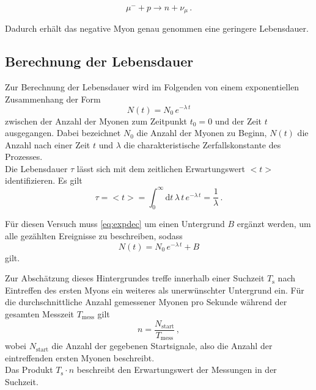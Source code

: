 \begin{equation*}
    \mu^- + p \rightarrow n + \nu_\mu \,.
\end{equation*}

Dadurch erhält das negative Myon genau genommen eine geringere Lebensdauer.


\subsection{Berechnung der Lebensdauer}

Zur Berechnung der Lebensdauer wird im Folgenden von einem exponentiellen Zusammenhang der Form
\begin{equation}
    N(t) = N_0 \, e^{-\lambda \, t}
    \label{eq:expdec}
\end{equation}
zwischen der Anzahl der Myonen zum Zeitpunkt $t_0 = 0$ und der Zeit $t$ ausgegangen. 
Dabei bezeichnet $N_0$ die Anzahl der Myonen zu Beginn, $N(t)$ die Anzahl nach einer Zeit $t$ und $\lambda$ die charakteristische Zerfallskonstante des Prozesses. \\

Die Lebensdauer $\tau$ lässt sich mit dem zeitlichen Erwartungswert $<t>$ identifizieren.
Es gilt
\begin{equation}
    \tau = <t> = \int_0^\infty \text{d} t \, \lambda \, t \, e^{-\lambda \, t} = \frac{1}{\lambda} \,.
\end{equation} 

Für diesen Versuch muss \eqref{eq:expdec} um einen Untergrund $B$ ergänzt werden, um alle gezählten Ereignisse zu beschreiben, sodass
\begin{equation}
    N(t) = N_0 \, e^{-\lambda \, t} + B
    \label{eq:exponential_decay}
\end{equation}
gilt.

Zur Abschätzung dieses Hintergrundes treffe innerhalb einer Suchzeit $T_\text{s}$ nach Eintreffen des ersten Myons ein weiteres als unerwünschter Untergrund ein.
Für die durchschnittliche Anzahl gemessener Myonen pro Sekunde während der gesamten Messzeit $T_\text{mess}$ gilt
\begin{equation*}
    n = \frac{N_\text{start}}{T_\text{mess}} \,,
\end{equation*}
wobei $N_\text{start}$ die Anzahl der gegebenen Startsignale, also die Anzahl der eintreffenden ersten Myonen beschreibt. \\

Das Produkt $T_\text{s} \cdot n$ beschreibt den Erwartungswert der Messungen in der Suchzeit. \\

